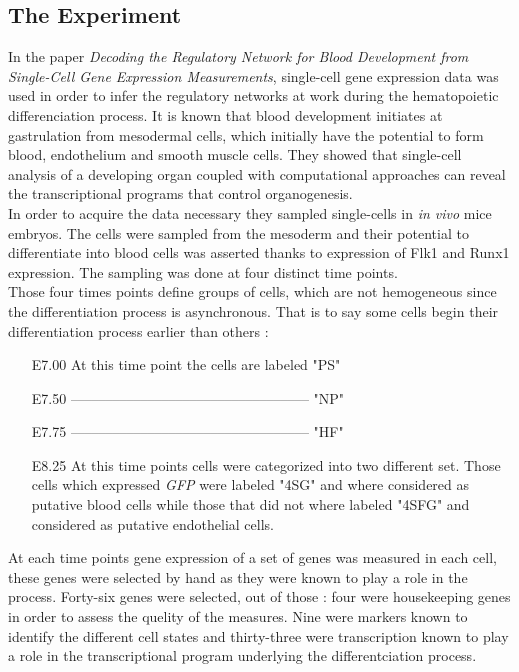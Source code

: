 \documentclass[a4paper,12pt]{book}
\theoremstyle{break}
\begin{document}
\subsection*{The Experiment}
	In the paper \textit{Decoding the Regulatory Network for Blood Development from Single-Cell Gene Expression Measurements}, single-cell gene expression data was used in order to infer the regulatory networks at work during the hematopoietic differenciation process. It is known that blood development
	initiates at gastrulation from mesodermal cells, which initially have the potential to form blood, endothelium and smooth muscle cells. They showed that single-cell analysis of a developing organ coupled with computational approaches can reveal the transcriptional programs that control organogenesis.\\
	In order to acquire the data necessary they sampled single-cells in \textit{in vivo} mice embryos. The cells were sampled from the mesoderm and their potential to differentiate into blood cells was asserted thanks to expression of Flk1 and Runx1 expression. The sampling was done at four distinct time points.\\
	Those four times points define groups of cells, which are not hemogeneous since the differentiation process is asynchronous. That is to say some cells begin their differentiation process earlier than others :
	\begin{itemize}
		\item[E7.00] At this time point the cells are labeled "PS"
		\item[E7.50] –––––––––––––––––––––––––––––––––– "NP"
		\item[E7.75] –––––––––––––––––––––––––––––––––– "HF"
		\item[E8.25] At this time points cells were categorized into two different set. Those cells which expressed \textit{GFP} were labeled "4SG" and where considered as putative blood cells while those that did not where labeled "4SFG" and considered as putative endothelial cells. 
	\end{itemize}
	At each time points gene expression of a set of genes was measured in each cell, these genes were selected by hand as they were known to play a role in the process. Forty-six genes were selected, out of those : four were housekeeping genes in order to assess the quelity of the measures. Nine were markers known to identify the different cell states and thirty-three were transcription known to play a role in the transcriptional program underlying the differentciation process.
\end{document}
